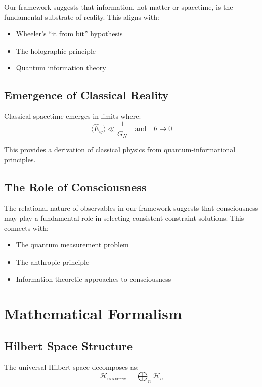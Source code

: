 \documentclass[12pt,a4paper]{article}
\begin{document}
Our framework suggests that information, not matter or spacetime, is the fundamental substrate of reality. This aligns with:
\begin{itemize}
\item Wheeler's ``it from bit'' hypothesis
\item The holographic principle
\item Quantum information theory
\end{itemize}

\subsection{Emergence of Classical Reality}

Classical spacetime emerges in limits where:
\begin{equation}
\langle \hat{E}_{ij} \rangle \ll \frac{1}{G_N} \quad \text{and} \quad \hbar \to 0
\end{equation}

This provides a derivation of classical physics from quantum-informational principles.

\subsection{The Role of Consciousness}

The relational nature of observables in our framework suggests that consciousness may play a fundamental role in selecting consistent constraint solutions. This connects with:
\begin{itemize}
\item The quantum measurement problem
\item The anthropic principle
\item Information-theoretic approaches to consciousness
\end{itemize}

\section{Mathematical Formalism}

\subsection{Hilbert Space Structure}

The universal Hilbert space decomposes as:
\begin{equation}
\mathcal{H}_{universe} = \bigoplus_{n} \mathcal{H}_n
\end{equation}
\end{document}
